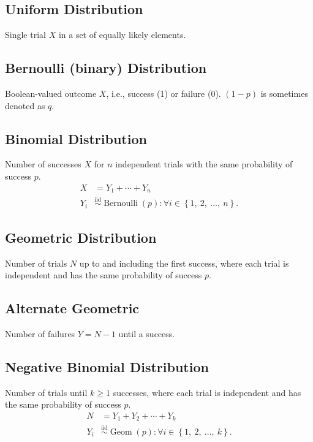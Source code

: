\documentclass{article}
\begin{document}
\begin{minipage}{62.39259259mm}
    \subsection{Uniform Distribution}
    Single trial \(X\) in a set of equally likely elements.
    \subsection{Bernoulli (binary) Distribution}
    Boolean-valued outcome \(X\), i.e., success (1) or failure (0).
    \(\left( 1 - p \right)\) is sometimes denoted as \(q\).
    \subsection{Binomial Distribution}
    Number of successes \(X\) for \(n\) independent trials with the same probability of success \(p\).
    \begin{align*}
        X   & = Y_1 + \cdots + Y_n                                                                                                           \\
        Y_i & \overset{\mathrm{iid}}{\sim} \operatorname{Bernoulli}{\left( p \right)} : \forall i \in \left\{ 1,\: 2,\: \dots,\: n \right\}.
    \end{align*}
    \subsection{Geometric Distribution}
    Number of trials \(N\) up to and including the first success, where each trial is independent and has the same probability of success \(p\).
    \subsection{Alternate Geometric}
    Number of failures \(Y = N - 1\) until a success.
    \subsection{Negative Binomial Distribution}
    Number of trials until \(k \geq 1\) successes, where each trial is independent and has the same probability of success \(p\).
    \begin{align*}
        N   & = Y_1 + Y_2 + \cdots + Y_k                                                                                                \\
        Y_i & \overset{\mathrm{iid}}{\sim} \operatorname{Geom}{\left( p \right)} : \forall i \in \left\{ 1,\: 2,\: \dots,\: k \right\}.
    \end{align*}

\end{minipage}
\end{document}
